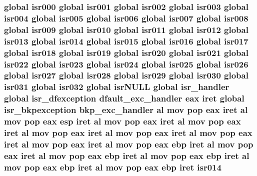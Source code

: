 \subsubsection[{\texorpdfstring{isr014}{isr014}}]{\setlength{\rightskip}{0pt plus 5cm}global {\bf isr000} global {\bf isr001} global {\bf isr002} global {\bf isr003} global {\bf isr004} global {\bf isr005} global {\bf isr006} global {\bf isr007} global {\bf isr008} global {\bf isr009} global {\bf isr010} global {\bf isr011} global {\bf isr012} global {\bf isr013} global isr014 global {\bf isr015} global {\bf isr016} global {\bf isr017} global {\bf isr018} global {\bf isr019} global {\bf isr020} global {\bf isr021} global {\bf isr022} global {\bf isr023} global {\bf isr024} global {\bf isr025} global {\bf isr026} global {\bf isr027} global {\bf isr028} global {\bf isr029} global {\bf isr030} global {\bf isr031} global isr032 global isr\+N\+U\+LL global isr\+\_\+handler global {\bf isr\+\_\+dfexception} {\bf dfault\+\_\+exc\+\_\+handler} eax iret global {\bf isr\+\_\+bkpexception} {\bf bkp\+\_\+exc\+\_\+handler} {\bf al} {\bf mov} pop eax iret {\bf al} {\bf mov} pop eax esp iret {\bf al} {\bf mov} pop eax iret {\bf al} {\bf mov} pop eax iret {\bf al} {\bf mov} pop eax iret {\bf al} {\bf mov} pop eax iret {\bf al} {\bf mov} pop eax iret {\bf al} {\bf mov} pop eax iret {\bf al} {\bf mov} pop eax ebp iret {\bf al} {\bf mov} pop eax iret {\bf al} {\bf mov} pop eax ebp iret {\bf al} {\bf mov} pop eax ebp iret {\bf al} {\bf mov} pop eax ebp iret {\bf al} {\bf mov} pop eax ebp iret isr014}\hypertarget{isrs_8as_ae1d7daa238e457ec8f67c50c078469cd}{}\label{isrs_8as_ae1d7daa238e457ec8f67c50c078469cd}
